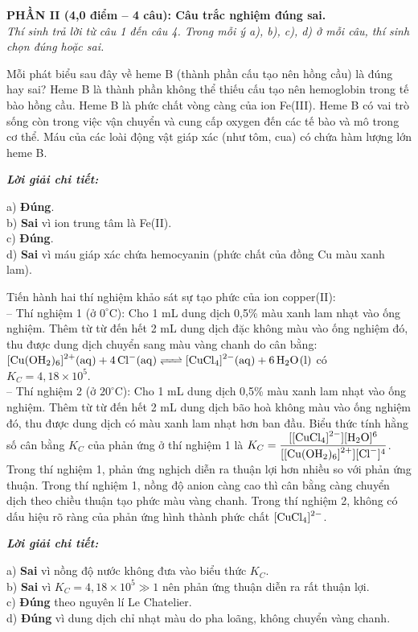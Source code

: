 \documentclass[11pt,a4paper]{article}
\def\loigiai#1{
\par\begingroup\color{blue!80!black}\small
\noindent\textbf{\textit{Lời giải chi tiết:}}\par
#1\par\endgroup}
\begin{document}
\noindent
\textbf{PHẦN II (4,0 điểm -- 4 câu): Câu trắc nghiệm đúng sai.}\\
\textit{Thí sinh trả lời từ câu 1 đến câu 4. Trong mỗi ý a), b), c), d) ở mỗi câu, thí sinh chọn đúng hoặc sai.}

\setcounter{ex}{0}

\begin{ex}
Mỗi phát biểu sau đây về heme B (thành phần cấu tạo nên hồng cầu) là đúng hay sai?
\choiceTF
{\True Heme B là thành phần không thể thiếu cấu tạo nên hemoglobin trong tế bào hồng cầu.}
{Heme B là phức chất vòng càng của ion Fe(III).}
{\True Heme B có vai trò sống còn trong việc vận chuyển và cung cấp oxygen đến các tế bào và mô trong cơ thể.}
{Máu của các loài động vật giáp xác (như tôm, cua) có chứa hàm lượng lớn heme B.}
\loigiai{
a) \textbf{Đúng}.\\
b) \textbf{Sai} vì ion trung tâm là Fe(II).\\
c) \textbf{Đúng}.\\
d) \textbf{Sai} vì máu giáp xác chứa hemocyanin (phức chất của đồng Cu màu xanh lam).}
\end{ex}

\begin{ex}
Tiến hành hai thí nghiệm khảo sát sự tạo phức của ion copper(II):\\
-- Thí nghiệm 1 (ở $0^\circ\text{C}$): Cho 1 mL dung dịch  0,5\% màu xanh lam nhạt vào ống nghiệm. Thêm từ từ đến hết 2 mL dung dịch  đặc không màu vào ống nghiệm đó, thu được dung dịch chuyển sang màu vàng chanh do cân bằng: $\ce{[Cu(OH2)6]^2+(aq) + 4Cl-(aq) <=> [CuCl4]^2-(aq) + 6H2O(l)}$ có $K_C = 4{,}18\times 10^5$.\\
-- Thí nghiệm 2 (ở $20^\circ\text{C}$): Cho 1 mL dung dịch  0,5\% màu xanh lam nhạt vào ống nghiệm. Thêm từ từ đến hết 2 mL dung dịch  bão hoà không màu vào ống nghiệm đó, thu được dung dịch có màu xanh lam nhạt hơn ban đầu.
\choiceTF
{Biểu thức tính hằng số cân bằng $K_C$ của phản ứng ở thí nghiệm 1 là $K_C = \dfrac{[\ce{[CuCl4]^2-}][\ce{H2O}]^6}{[\ce{[Cu(OH2)6]^2+}][\ce{Cl-}]^4}$.}
{Trong thí nghiệm 1, phản ứng nghịch diễn ra thuận lợi hơn nhiều so với phản ứng thuận.}
{\True Trong thí nghiệm 1, nồng độ anion  càng cao thì cân bằng càng chuyển dịch theo chiều thuận tạo phức màu vàng chanh.}
{\True Trong thí nghiệm 2, không có dấu hiệu rõ ràng của phản ứng hình thành phức chất $\ce{[CuCl4]^2-}$.}
\loigiai{
a) \textbf{Sai} vì nồng độ nước  không đưa vào biểu thức $K_C$.\\
b) \textbf{Sai} vì $K_C = 4{,}18\times 10^5 \gg 1$ nên phản ứng thuận diễn ra rất thuận lợi.\\
c) \textbf{Đúng} theo nguyên lí Le Chatelier.\\
d) \textbf{Đúng} vì dung dịch chỉ nhạt màu do pha loãng, không chuyển vàng chanh.}
\end{ex}
\end{document}
